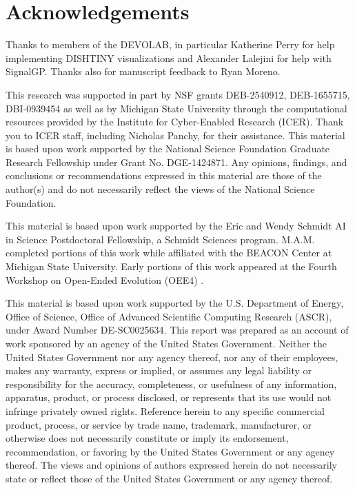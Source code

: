 \section*{Acknowledgements}

Thanks to members of the DEVOLAB, in particular Katherine Perry for help implementing DISHTINY visualizations and Alexander Lalejini for help with SignalGP.
Thanks also for manuscript feedback to Ryan Moreno.

This research was supported in part by NSF grants DEB-2540912, DEB-1655715, DBI-0939454 as well as by Michigan State University through the computational resources provided by the Institute for Cyber-Enabled Research (ICER).
Thank you to ICER staff, including Nicholas Panchy, for their assistance.
This material is based upon work supported by the National Science Foundation Graduate Research Fellowship under Grant No. DGE-1424871.
Any opinions, findings, and conclusions or recommendations expressed in this material are those of the author(s) and do not necessarily reflect the views of the National Science Foundation.

This material is based upon work supported by the Eric and Wendy Schmidt AI in Science Postdoctoral Fellowship, a Schmidt Sciences program.
M.A.M. completed portions of this work while affiliated with the BEACON Center at Michigan State University.
Early portions of this work appeared at the Fourth Workshop on Open-Ended Evolution (OEE4) \citep{moreno2021case}.

This material is based upon work supported by the U.S. Department of Energy, Office of Science, Office of Advanced Scientific Computing Research (ASCR), under Award Number DE-SC0025634.
This report was prepared as an account of work sponsored by an agency of the United States Government.
Neither the United States Government nor any agency thereof, nor any of their employees, makes any warranty, express or implied, or assumes any legal liability or responsibility for the accuracy, completeness, or usefulness of any information, apparatus, product, or process disclosed, or represents that its use would not infringe privately owned rights.
Reference herein to any specific commercial product, process, or service by trade name, trademark, manufacturer, or otherwise does not necessarily constitute or imply its endorsement, recommendation, or favoring by the United States Government or any agency thereof.
The views and opinions of authors expressed herein do not necessarily state or reflect those of the United States Government or any agency thereof.

\endgroup
